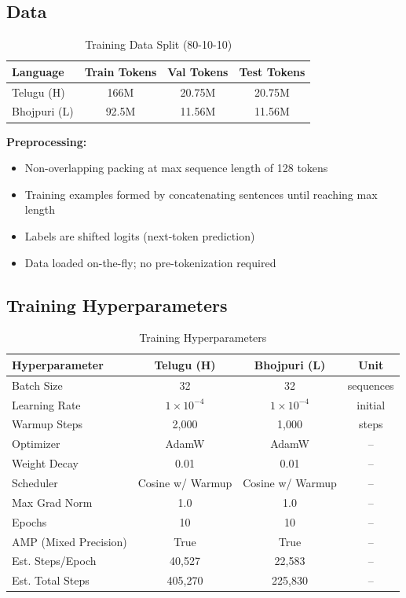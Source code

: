 \documentclass[11pt,a4paper]{article}
\begin{document}
\subsection{Data}

\begin{table}[H]
\centering
\begin{tabular}{lccc}
\toprule
\textbf{Language} & \textbf{Train Tokens} & \textbf{Val Tokens} & \textbf{Test Tokens} \\
\midrule
Telugu (H) & 166M & 20.75M & 20.75M \\
Bhojpuri (L) & 92.5M & 11.56M & 11.56M \\
\bottomrule
\end{tabular}
\caption{Training Data Split (80-10-10)}
\end{table}

\textbf{Preprocessing:}
\begin{itemize}
    \item Non-overlapping packing at max sequence length of 128 tokens
    \item Training examples formed by concatenating sentences until reaching max length
    \item Labels are shifted logits (next-token prediction)
    \item Data loaded on-the-fly; no pre-tokenization required
\end{itemize}

\subsection{Training Hyperparameters}

\begin{table}[H]
\centering
\begin{tabular}{lccc}
\toprule
\textbf{Hyperparameter} & \textbf{Telugu (H)} & \textbf{Bhojpuri (L)} & \textbf{Unit} \\
\midrule
Batch Size & 32 & 32 & sequences \\
Learning Rate & $1 \times 10^{-4}$ & $1 \times 10^{-4}$ & initial \\
Warmup Steps & 2,000 & 1,000 & steps \\
Optimizer & AdamW & AdamW & -- \\
Weight Decay & 0.01 & 0.01 & -- \\
Scheduler & Cosine w/ Warmup & Cosine w/ Warmup & -- \\
Max Grad Norm & 1.0 & 1.0 & -- \\
Epochs & 10 & 10 & -- \\
AMP (Mixed Precision) & True & True & -- \\
\midrule
Est. Steps/Epoch & 40,527 & 22,583 & -- \\
Est. Total Steps & 405,270 & 225,830 & -- \\
\bottomrule
\end{tabular}
\caption{Training Hyperparameters}
\end{table}
\end{document}
